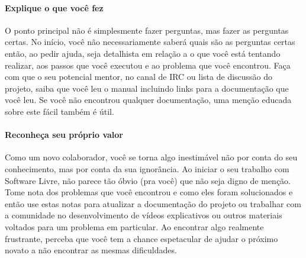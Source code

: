 \paragraph*{Explique o que você fez} O ponto principal não é simplesmente fazer perguntas,
mas fazer as perguntas certas. No início, você não necessariamente saberá quais são as
perguntas certas então, ao pedir ajuda, seja detalhista em relação a o que você está
tentando realizar, aos passos que você executou e ao problema que você encontrou.
Faça com que o seu potencial mentor, no canal de IRC ou lista de discussão do projeto,
saiba que você leu o manual incluindo links para a documentação que você leu. Se você
não encontrou qualquer documentação, uma menção educada sobre este fácil também é útil.


\paragraph*{Reconheça seu próprio valor} Como um novo colaborador, você se torna
algo inestimável não por conta do seu conhecimento, mas por conta da sua ignorância.
Ao iniciar o seu trabalho com Software Livre, não parece tão óbvio (pra você) que não
seja digno de menção. Tome nota dos problemas que você encontrou e como eles foram
solucionados e então use estas notas para atualizar a documentação do projeto ou
trabalhar com a comunidade no desenvolvimento de vídeos explicativos ou outros
materiais voltados para um problema em particular. Ao encontrar algo realmente
frustrante, perceba que você tem a chance espetacular de ajudar o próximo novato
a não encontrar as mesmas dificuldades.
